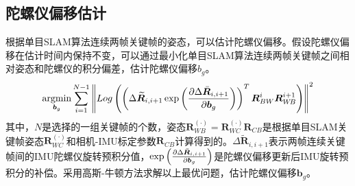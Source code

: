 \subsection{陀螺仪偏移估计}
根据单目SLAM算法连续两帧关键帧的姿态，可以估计陀螺仪偏移。假设陀螺仪偏移在估计时间内保持不变，可以通过最小化单目SLAM算法连续两帧关键帧之间相对姿态和陀螺仪的积分偏差，估计陀螺仪偏移$b_g$。
\begin{equation}
\label{equ5.28}
\operatorname*{argmin}\limits_{\boldsymbol{b}_g}\sum\limits_{i=1}^{N-1} \left \Vert Log \left( \left( \Delta \widetilde{\boldsymbol{R}}_{i,i+1} \exp \left( { \partial \Delta \bar{\boldsymbol{R}}_{i,i+1} \over \partial \boldsymbol{b}_g  } \right) \right)^T \boldsymbol{R}_{BW}^i \boldsymbol{R}_{W\!B}^{i+1} \right)  \right \Vert^2
\end{equation}
其中，$N$是选择的一组关键帧的个数，姿态$\boldsymbol{R}_{W\!B}^{(\cdot)}=\boldsymbol{R}_{WC}^{(\cdot)}\boldsymbol{R}_{CB}$是根据单目SLAM关键帧姿态$\boldsymbol{R}_{WC}^{(\cdot)}$和相机-IMU标定参数$\boldsymbol{R}_{CB}$计算得到的。$\Delta \widetilde{\boldsymbol{R}}_{i,i+1}$表示两帧连续关键帧间的IMU陀螺仪旋转预积分值，$\exp \left( { \partial \Delta \bar{\boldsymbol{R}}_{i,i+1} \over \partial \boldsymbol{b}_g  } \right)$是陀螺仪偏移更新后IMU旋转预积分的补偿。采用高斯-牛顿方法求解以上最优问题，估计陀螺仪偏移$\boldsymbol{b}_g$。


